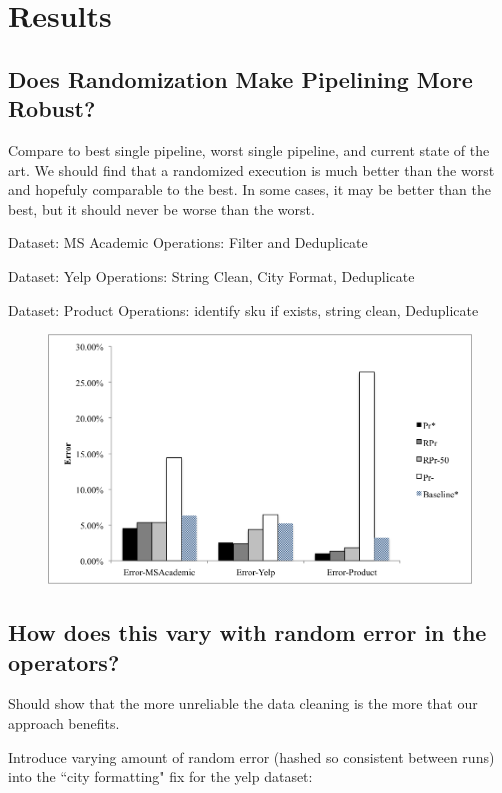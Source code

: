 \section{Results}

\subsection{Does Randomization Make Pipelining More Robust?}
Compare to best single pipeline, worst single pipeline, and current state of the art.
We should find that a randomized execution is much better than the worst and hopefuly comparable to the best.
In some cases, it may be better than the best, but it should never be worse than the worst.

Dataset: MS Academic 
Operations: Filter and Deduplicate

Dataset: Yelp 
Operations: String Clean, City Format, Deduplicate

Dataset: Product 
Operations: identify sku if exists, string clean, Deduplicate

\begin{figure}[t]\vspace{-1.8em}
\centering
\includegraphics[scale=0.4]{fig1.png}
\caption{}
\label{exp:ms-academic-ranking}
\end{figure}

\subsection{How does this vary with random error in the operators?}
Should show that the more unreliable the data cleaning is the more that our approach benefits.

Introduce varying amount of random error (hashed so consistent between runs) into the ``city formatting" fix for the yelp dataset:

